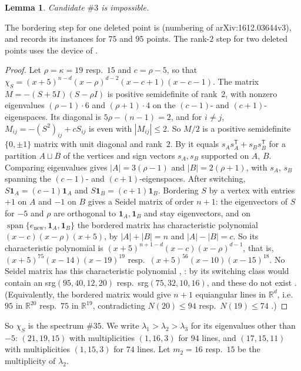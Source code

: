 \documentclass[11pt]{article}
\newtheorem{lemma}[theorem]{Lemma}
\theoremstyle{definition}
\newcommand{\R}{\mathbb{R}}
\begin{document}
\begin{lemma}\label{lem:no3}
Candidate $\#3$ is impossible.
\end{lemma}
The bordering step for one deleted point is \cite[Prop.~5.3, Cor.~5.4]{Gre18} (numbering of
arXiv:1612.03644v3), and \cite[Remark~5.5]{Gre18} records its instances for $75$ and $95$ points. The
rank-$2$ step for two deleted points uses the device of \cite[Lemma~5.24, Thm.~5.25]{GKMS16}.
\begin{proof}
Let $\rho=\kappa=19$ resp.\ $15$ and $c=\rho-5$, so that $\chi_S=(x+5)^{n-d}(x-\rho)^{d-2}(x-c+1)(x-c-1)$.
The matrix $M=-(S+5I)(S-\rho I)$ is positive semidefinite of rank~$2$, with nonzero eigenvalues
$(\rho-1)\cdot6$ and $(\rho+1)\cdot4$ on the $(c-1)$- and $(c+1)$-eigenspaces. Its diagonal is
$5\rho-(n-1)=2$, and for $i\ne j$, $M_{ij}=-(S^2)_{ij}+cS_{ij}$ is even with $|M_{ij}|\le2$. So $M/2$ is a
positive semidefinite $\{0,\pm1\}$ matrix with unit diagonal and rank~$2$. By \cite[Lemma~5.24]{GKMS16}
it equals $s_As_A^{\mathsf T}+s_Bs_B^{\mathsf T}$ for a partition $A\sqcup B$ of the vertices and sign
vectors $s_A,s_B$ supported on $A$, $B$. Comparing eigenvalues gives $|A|=3(\rho-1)$ and
$|B|=2(\rho+1)$, with $s_A$, $s_B$ spanning the $(c-1)$- and $(c+1)$-eigenspaces. After switching,
$S\mathbf 1_A=(c-1)\mathbf 1_A$ and $S\mathbf 1_B=(c+1)\mathbf 1_B$. Bordering $S$ by a vertex with
entries $+1$ on $A$ and $-1$ on $B$ gives a Seidel matrix of order $n+1$: the eigenvectors of $S$ for
$-5$ and $\rho$ are orthogonal to $\mathbf 1_A,\mathbf 1_B$ and stay eigenvectors, and on
$\operatorname{span}\{e_{\mathrm{new}},\mathbf 1_A,\mathbf 1_B\}$ the bordered matrix has characteristic
polynomial $(x-c)(x-\rho)(x+5)$, by $|A|+|B|=n$ and $|A|-|B|=c$. So its characteristic polynomial is
$(x+5)^{n+1-d}(x-c)(x-\rho)^{d-1}$, that is, $(x+5)^{75}(x-14)(x-19)^{19}$ resp.\
$(x+5)^{56}(x-10)(x-15)^{18}$. No Seidel matrix has this characteristic polynomial
\cite[Thm.~5.1]{GSY21}, \cite[Remark~5.5]{Gre18}: by \cite[Cor.~5.4]{Gre18} its switching class would
contain an srg$(95,40,12,20)$ resp.\ srg$(75,32,10,16)$, and these do not exist \cite{AM20,AM18}.
(Equivalently, the bordered matrix would give $n+1$ equiangular lines in $\R^d$, i.e.\ $95$ in $\R^{20}$
resp.\ $75$ in $\R^{19}$, contradicting $N(20)\le94$ \cite[Thm.~5.5]{GSY21} resp.\ $N(19)\le74$
\cite[Thm.~5.2]{GSY21}.)
\end{proof}

So $\chi_S$ is the spectrum $\#35$. We write $\lambda_1>\lambda_2>\lambda_3$ for its eigenvalues other
than $-5$: $(21,19,15)$ with multiplicities $(1,16,3)$ for $94$ lines, and $(17,15,11)$ with
multiplicities $(1,15,3)$ for $74$ lines. Let $m_2=16$ resp.\ $15$ be the multiplicity of $\lambda_2$.
\end{document}
